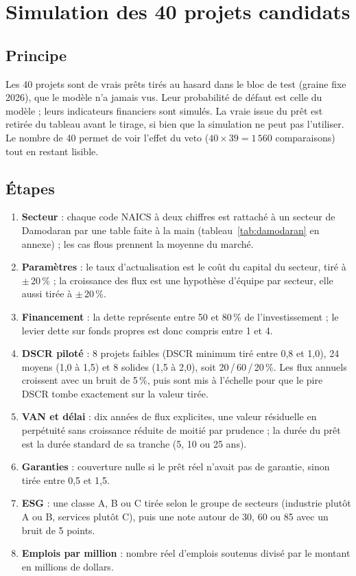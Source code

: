 \section{Simulation des 40 projets candidats}\label{sec:simulation}

\subsection{Principe}

Les 40 projets sont de vrais prêts tirés au hasard dans le bloc de test (graine fixe 2026), que le modèle n'a jamais
vus. Leur probabilité de défaut est celle du modèle ; leurs indicateurs financiers sont simulés. La vraie issue du
prêt est retirée du tableau avant le tirage, si bien que la simulation ne peut pas l'utiliser. Le nombre de 40 permet
de voir l'effet du veto ($40 \times 39 = 1\,560$ comparaisons) tout en restant lisible.

\subsection{Étapes}

\begin{enumerate}
  \item \textbf{Secteur} : chaque code NAICS à deux chiffres est rattaché à un secteur de Damodaran par une table
        faite à la main (tableau~\ref{tab:damodaran} en annexe) ; les cas flous prennent la moyenne du marché.
  \item \textbf{Paramètres} : le taux d'actualisation est le coût du capital du secteur, tiré à $\pm$\,20\,\% ; la
        croissance des flux est une hypothèse d'équipe par secteur, elle aussi tirée à $\pm$\,20\,\%.
  \item \textbf{Financement} : la dette représente entre 50 et 80\,\% de l'investissement ; le levier dette sur fonds
        propres est donc compris entre 1 et 4.
  \item \textbf{DSCR piloté} : 8 projets \og faibles \fg{} (DSCR minimum tiré entre 0,8 et 1,0), 24 \og moyens \fg{}
        (1,0 à 1,5) et 8 \og solides \fg{} (1,5 à 2,0), soit 20\,/\,60\,/\,20\,\%. Les flux annuels croissent avec un
        bruit de 5\,\%, puis sont mis à l'échelle pour que le pire DSCR tombe exactement sur la valeur tirée.
  \item \textbf{VAN et délai} : dix années de flux explicites, une valeur résiduelle en perpétuité sans croissance
        réduite de moitié par prudence ; la durée du prêt est la durée standard de sa tranche (5, 10 ou 25 ans).
  \item \textbf{Garanties} : couverture nulle si le prêt réel n'avait pas de garantie, sinon tirée entre 0,5 et 1,5.
  \item \textbf{ESG} : une classe A, B ou C tirée selon le groupe de secteurs (industrie plutôt A ou B, services plutôt
        C), puis une note autour de 30, 60 ou 85 avec un bruit de 5 points.
  \item \textbf{Emplois par million} : nombre réel d'emplois soutenus divisé par le montant en millions de dollars.
\end{enumerate}

